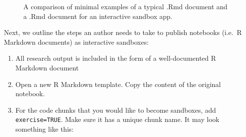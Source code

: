 \begin{Schunk}
\begin{figure}

{\centering {}

}

\caption[A comparison of minimal examples of a typical .Rmd document and a .Rmd document for an interactive sandbox app]{A comparison of minimal examples of a typical .Rmd document and a .Rmd document for an interactive sandbox app.}\label{fig:fig-skeleton}
\end{figure}
\end{Schunk}

Next, we outline the steps an author needs to take to publish notebooks
(i.e.~R Markdown documents) as interactive sandboxes:

\begin{enumerate}
\def\labelenumi{\arabic{enumi}.}
\tightlist
\item
  All research output is included in the form of a well-documented R
  Markdown document
\item
  Open a new  R Markdown template. Copy the content of
  the original notebook.
\item
  For the code chunks that you would like to become sandboxes, add
  \texttt{exercise=TRUE}. Make sure it has a unique chunk name. It may
  look something like this:
\end{enumerate}

